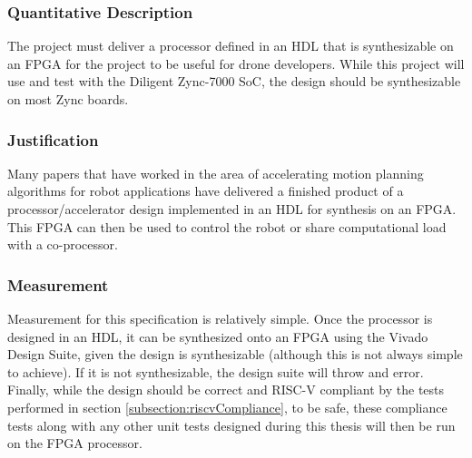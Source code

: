 \subsubsection{Quantitative Description}
The project must deliver a processor defined in an \ac{HDL} that is synthesizable on an FPGA for the project to be useful for drone developers. While this project will use and test with the Diligent Zync-7000 \ac{SoC}\cite{Zync}, the design should be synthesizable on most Zync boards.
\subsubsection{Justification}
Many papers that have worked in the area of accelerating motion planning algorithms for robot applications have delivered a finished product of a processor/accelerator design implemented in an \ac{HDL} for synthesis on an FPGA.\cite{Murray}\cite{Atay2006}\cite{Malik2015} This FPGA can then be used to control the robot or share computational load with a co-processor.
\subsubsection{Measurement}
Measurement for this specification is relatively simple. Once the processor is designed in an \ac{HDL}, it can be synthesized onto an FPGA using the Vivado Design Suite, given the design is synthesizable (although this is not always simple to achieve). If it is not synthesizable, the design suite will throw and error.
Finally, while the design should be correct and RISC-V compliant by the tests performed in section \ref{subsection:riscvCompliance}, to be safe, these compliance tests along with any other unit tests designed during this thesis will then be run on the \ac{FPGA} processor.